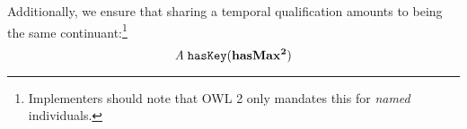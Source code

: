 Additionally, we ensure that sharing a temporal qualification amounts to being
the same continuant:\footnote{Implementers should note that OWL 2 only mandates
this for \emph{named} individuals.}
\begin{equation}
\mathit{A}\;\mathtt{hasKey}(\mathrm{\mathbf{hasMax^2}})
\end{equation}





%

%




